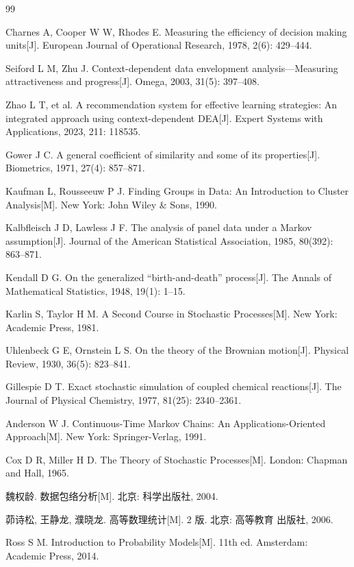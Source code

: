 \begingroup
{}
\renewcommand{\refname}{参考文献}
\begin{thebibliography}{99}

 Charnes A, Cooper W W, Rhodes E. Measuring the efficiency of
decision making units[J]. European Journal of Operational Research, 1978,
2(6): 429--444.

 Seiford L M, Zhu J. Context-dependent data envelopment
analysis---Measuring attractiveness and progress[J]. Omega, 2003, 31(5):
397--408.

 Zhao L T, et al. A recommendation system for effective learning
strategies: An integrated approach using context-dependent DEA[J]. Expert
Systems with Applications, 2023, 211: 118535.

 Gower J C. A general coefficient of similarity and some of its
properties[J]. Biometrics, 1971, 27(4): 857--871.

 Kaufman L, Rousseeuw P J. Finding Groups in Data: An
Introduction to Cluster Analysis[M]. New York: John Wiley \& Sons, 1990.

 Kalbfleisch J D, Lawless J F. The analysis of panel data under a
Markov assumption[J]. Journal of the American Statistical Association, 1985,
80(392): 863--871.

 Kendall D G. On the generalized ``birth-and-death''
process[J]. The Annals of Mathematical Statistics, 1948, 19(1): 1--15.

 Karlin S, Taylor H M. A Second Course in Stochastic
Processes[M]. New York: Academic Press, 1981.

 Uhlenbeck G E, Ornstein L S. On the theory of the Brownian
motion[J]. Physical Review, 1930, 36(5): 823--841.

 Gillespie D T. Exact stochastic simulation of coupled
chemical reactions[J]. The Journal of Physical Chemistry, 1977, 81(25):
2340--2361.

 Anderson W J. Continuous-Time Markov Chains: An
Applications-Oriented Approach[M]. New York: Springer-Verlag, 1991.

 Cox D R, Miller H D. The Theory of Stochastic Processes[M].
London: Chapman and Hall, 1965.

 魏权龄. 数据包络分析[M]. 北京: 科学出版社, 2004.

 茆诗松, 王静龙, 濮晓龙. 高等数理统计[M]. 2 版. 北京: 高等教育
出版社, 2006.

 Ross S M. Introduction to Probability Models[M]. 11th ed.
Amsterdam: Academic Press, 2014.

\end{thebibliography}
\endgroup

